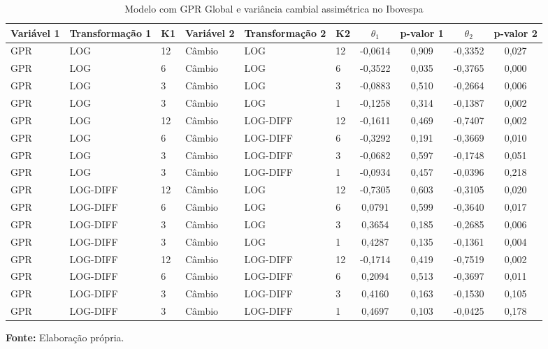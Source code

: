 \begin{table}[H]
\centering
\caption{Modelo com GPR Global e variância cambial assimétrica no Ibovespa}
\label{tab:modelo-gpr-cambio-ibov}
\scriptsize
\begin{adjustbox}{max width=\textwidth}
\begin{tabular}{@{}llllllcccc@{}}
\toprule
Variável 1 & Transformação 1 & K1 & Variável 2 & Transformação 2 & K2 & $\theta_1$ & p-valor 1 & $\theta_2$ & p-valor 2 \\
\midrule
GPR & LOG & 12 & Câmbio & LOG & 12 & -0,0614 & 0,909 & -0,3352 & 0,027 \\
GPR & LOG & 6 & Câmbio & LOG & 6 & -0,3522 & 0,035 & -0,3765 & 0,000 \\
GPR & LOG & 3 & Câmbio & LOG & 3 & -0,0883 & 0,510 & -0,2664 & 0,006 \\
GPR & LOG & 3 & Câmbio & LOG & 1 & -0,1258 & 0,314 & -0,1387 & 0,002 \\
GPR & LOG & 12 & Câmbio & LOG-DIFF & 12 & -0,1611 & 0,469 & -0,7407 & 0,002 \\
GPR & LOG & 6 & Câmbio & LOG-DIFF & 6 & -0,3292 & 0,191 & -0,3669 & 0,010 \\
GPR & LOG & 3 & Câmbio & LOG-DIFF & 3 & -0,0682 & 0,597 & -0,1748 & 0,051 \\
GPR & LOG & 3 & Câmbio & LOG-DIFF & 1 & -0,0934 & 0,457 & -0,0396 & 0,218 \\
GPR & LOG-DIFF & 12 & Câmbio & LOG & 12 & -0,7305 & 0,603 & -0,3105 & 0,020 \\
GPR & LOG-DIFF & 6 & Câmbio & LOG & 6 & 0,0791 & 0,599 & -0,3640 & 0,017 \\
GPR & LOG-DIFF & 3 & Câmbio & LOG & 3 & 0,3654 & 0,185 & -0,2685 & 0,006 \\
GPR & LOG-DIFF & 3 & Câmbio & LOG & 1 & 0,4287 & 0,135 & -0,1361 & 0,004 \\
GPR & LOG-DIFF & 12 & Câmbio & LOG-DIFF & 12 & -0,1714 & 0,419 & -0,7519 & 0,002 \\
GPR & LOG-DIFF & 6 & Câmbio & LOG-DIFF & 6 & 0,2094 & 0,513 & -0,3697 & 0,011 \\
GPR & LOG-DIFF & 3 & Câmbio & LOG-DIFF & 3 & 0,4160 & 0,163 & -0,1530 & 0,105 \\
GPR & LOG-DIFF & 3 & Câmbio & LOG-DIFF & 1 & 0,4697 & 0,103 & -0,0425 & 0,178 \\
\bottomrule
\end{tabular}
\end{adjustbox}
\vspace{1mm}
\begin{minipage}{\textwidth}
\footnotesize
\textbf{Fonte:} Elaboração própria.
\end{minipage}
\end{table}

